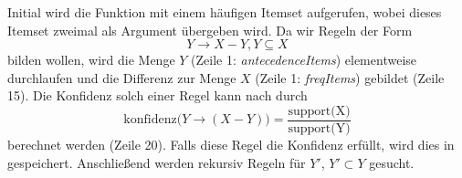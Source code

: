 Initial wird die Funktion  mit einem häufigen Itemset aufgerufen, wobei dieses Itemset zweimal als Argument übergeben wird. Da wir Regeln der Form 
\begin{equation*}
	Y \rightarrow X - Y, Y \subseteq X
\end{equation*}
bilden wollen, wird die Menge $Y$ (Zeile 1: \textit{antecedenceItems}) elementweise durchlaufen und die Differenz zur Menge $X$ (Zeile 1: \textit{freqItems}) gebildet (Zeile 15). Die Konfidenz solch einer Regel kann nach \citet{EsSa00} durch 
\begin{equation*}
	\text{konfidenz(}Y \rightarrow (X-Y)\text{)} = \frac{\text{support(X)}}{\text{support(Y)}}
\end{equation*}
berechnet werden (Zeile 20). Falls diese Regel die Konfidenz erfüllt, wird dies in \mbox{} gespeichert. Anschließend werden rekursiv Regeln für $Y'$, $Y' \subset Y$ gesucht.


\clearpage
